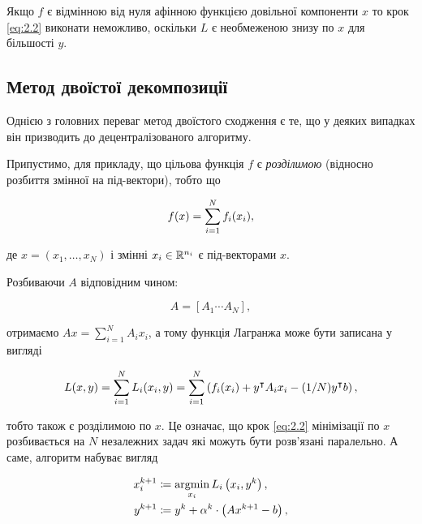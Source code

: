 \begin{example}
    Якщо $f$ є відмінною від нуля афінною функцією довільної компоненти $x$ то крок \eqref{eq:2.2} виконати неможливо, оскільки $L$ є необмеженою знизу по $x$ для більшості $y$. 
\end{example}

\subsection{Метод двоїстої декомпозиції}

Однією з головних переваг метод двоїстого сходження є те, що у деяких випадках він призводить до децентралізованого алгоритму. 

\begin{assumption}
    Припустимо, для прикладу, що цільова функція $f$ є \textit{розділимою} (відносно розбиття змінної на під-вектори), тобто що
    
    \begin{equation}
    	f(x) = \operatorname*{\sum}_{i=1}^N f_i(x_i),
    \end{equation}
    
    де $x = (x_1, \ldots, x_N)$ і змінні $x_i \in \mathbb{R}^{n_i}$ є під-векторами $x$.
\end{assumption}

Розбиваючи $A$ відповідним чином:

\begin{equation}
	A = [A_1 \cdots A_N],
\end{equation}

отримаємо $Ax = \sum_{i=1}^N A_i x_i$, а тому функція Лагранжа може бути записана у вигляді

\begin{equation}
	L(x, y) = \operatorname*{\sum}_{i = 1}^N L_i(x_i, y) = 
	\operatorname*{\sum}_{i = 1}^N \left( f_i(x_i) + y^\intercal A_i x_i - (1 / N) y^\intercal b \right),
\end{equation}

тобто також є розділимою по $x$. Це означає, що крок \eqref{eq:2.2} мінімізації по $x$ розбивається на $N$ незалежних задач які можуть бути розв'язані паралельно. А саме, алгоритм набуває вигляд

\begin{align}
	\label{eq:2.4}
	x_i^{k + 1} &\coloneqq \operatorname*{argmin}_{x_i} L_i \left( x_i, y^k \right), \\
	\label{eq:2.5}
	y^{k + 1} &\coloneqq y^k + \alpha^k \cdot \left( A x^{k + 1} - b \right),
\end{align}

